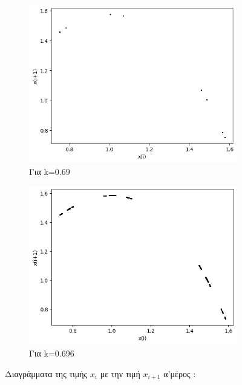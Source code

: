 \begin{figure}[h!]
\begin{subfigure}[b]{0.4\textwidth}
		\includegraphics[width=\textwidth]{LateX images/graphs q12/g7}
		\caption{Για k=0.69}
		\label{f:k63}
	\end{subfigure}
	\hfill
	\begin{subfigure}[b]{0.4\textwidth}
		\centering
		\includegraphics[width=\textwidth]{LateX images/graphs q12/g8}
		\caption{Για k=0.696}
		\label{f:k64}
	\end{subfigure}
	\hfill
	\caption{Διαγράμματα της τιμής \(x_i\) με την τιμή \(x_{i+1}\) α'μέρος :}
\end{figure}
